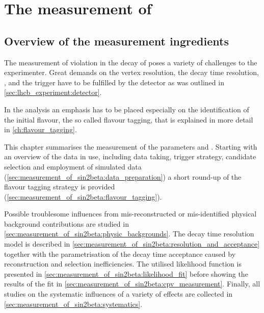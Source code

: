 
\chapter[
  head={The measurement of \sintwobetait},
  tocentry={The measurement of \sintwobetabfsfHyperref}
]
{The measurement of \sintwobetabfsf}
\label{ch:measurement_of_sin2beta}

\section{Overview of the measurement ingredients}
\label{sec:measurement_of_sin2beta:overview}

The measurement of \CP violation in the decay of \BdToJpsiKS poses a variety of
challenges to the experimenter. Great demands on the vertex resolution, the
decay time resolution, \PID, and the trigger have to be fulfilled by the \LHCb
detector as was outlined in \cref{sec:lhcb_experiment:detector}.

In the analysis an emphasis has to be placed especially on the identification of
the initial \Bmeson flavour, the so called flavour tagging, that is explained in
more detail in \cref{ch:flavour_tagging}.

This chapter summarises the measurement of the \CP parameters \SJpsiKS and
\CJpsiKS. Starting with an overview of the data in use, including data
taking, trigger strategy, candidate selection and employment of simulated data
(\cref{sec:measurement_of_sin2beta:data_preparation}) a short round-up of the
flavour tagging strategy is provided
(\cref{sec:measurement_of_sin2beta:flavour_tagging}).

Possible troublesome influences from mis-reconstructed or mis-identified
physical background contributions are studied in
\cref{sec:measurement_of_sin2beta:physic_backgrounds}. The decay time resolution
model is described in
\cref{sec:measurement_of_sin2beta:resolution_and_acceptance} together with
the parametrisation of the decay time acceptance caused by reconstruction and
selection inefficiencies. The utilised likelihood function is presented in
\cref{sec:measurement_of_sin2beta:likelihood_fit} before showing the results of
the fit in \cref{sec:measurement_of_sin2beta:cpv_measurement}. Finally, all
studies on the systematic influences of a variety of effects are collected in
\cref{sec:measurement_of_sin2beta:systematics}.

